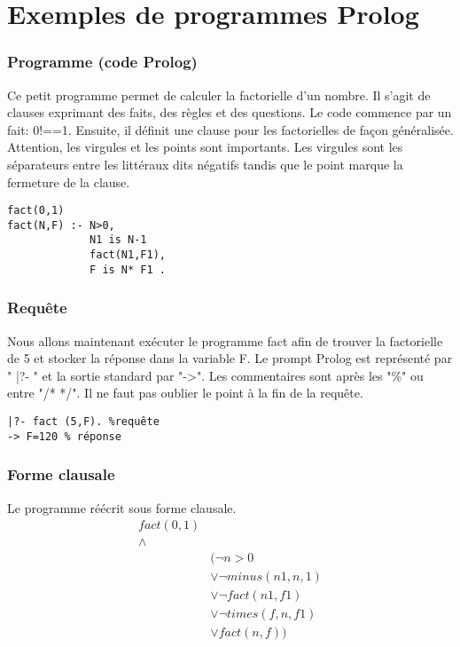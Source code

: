 \section{Exemples de programmes Prolog}

\subsubsection{Programme (code Prolog)}
Ce petit programme permet de calculer la factorielle d'un nombre. Il s'agit de clauses exprimant des faits, des règles et des questions. Le code commence par un fait: 0!==1. Ensuite, il définit une clause pour les factorielles de façon généralisée. Attention, les virgules et les points sont importants. Les virgules sont les séparateurs entre les littéraux dits négatifs tandis que le point marque la fermeture de la clause.
\begin{verbatim}
fact(0,1)
fact(N,F) :- N>0, 
			 N1 is N-1 
			 fact(N1,F1), 
			 F is N* F1 .
\end{verbatim}
\subsubsection{Requête} Nous allons maintenant exécuter le programme fact afin de trouver la factorielle de 5 et stocker la réponse dans la variable F. Le prompt Prolog est représenté par " |?- " et la sortie standard par "->". Les commentaires sont après les "\%" ou entre "/* */". Il ne faut pas oublier le point à la fin de la requête.
\begin{verbatim} 
|?- fact (5,F). %requête
-> F=120 % réponse
\end{verbatim}

\subsubsection{Forme clausale}
Le programme réécrit sous forme clausale. 
\begin{align*}
fact(0,1) \\
 \wedge & \\
&( \neg n > 0 \\
&	\vee \neg minus( n1, n, 1) \\
&	\vee \neg fact(n1, f1) \\
&	\vee \neg times(f, n, f1) \\
&	\vee fact(n, f) ) \\
\end{align*}



